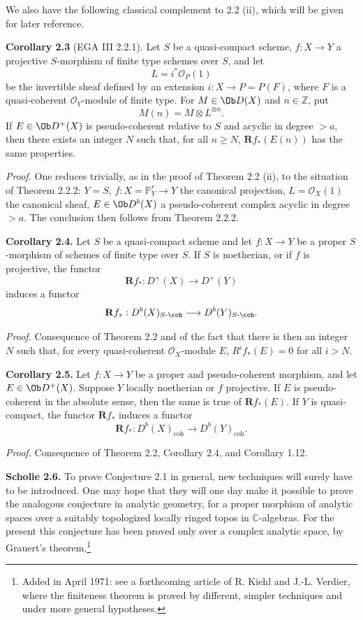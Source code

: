\documentclass[11pt]{article}
\begin{document}
We also have the following classical complement to 2.2 (ii), which will be given for later reference.

\textbf{Corollary 2.3} (EGA III 2.2.1). Let \(S\) be a quasi-compact scheme, \(f:X\to Y\) a projective \(S\)-morphism of finite type schemes over \(S\), and let
\[
  L=i^*\mathcal O_P(1)
\]
be the invertible sheaf defined by an extension \(i:X\to P=P(F)\), where \(F\) is a quasi-coherent \(\mathcal O_Y\)-module of finite type. For \(M\in \Ob D(X)\) and \(n\in\mathbb Z\), put
\[
  M(n)=M\otimes L^{\otimes n}.
\]
If \(E\in \Ob D^+(X)\) is pseudo-coherent relative to \(S\) and acyclic in degree \(>a\), then there exists an integer \(N\) such that, for all \(n\geq N\), \(\mathbf Rf_*(E(n))\) has the same properties.

\emph{Proof.} One reduces trivially, as in the proof of Theorem 2.2 (ii), to the situation of Theorem 2.2.2: \(Y=S\), \(f:X=\mathbb P^r_Y\to Y\) the canonical projection, \(L=\mathcal O_X(1)\) the canonical sheaf, \(E\in\Ob D^b(X)\) a pseudo-coherent complex acyclic in degree \(>a\). The conclusion then follows from Theorem 2.2.2.

\textbf{Corollary 2.4.} Let \(S\) be a quasi-compact scheme and let \(f:X\to Y\) be a proper \(S\)-morphism of schemes of finite type over \(S\). If \(S\) is noetherian, or if \(f\) is projective, the functor
\[
  \mathbf Rf_*:D^+(X)\longrightarrow D^+(Y)
\]
induces a functor
\[
  \mathbf Rf_*:D^b(X)_{S\text{-}\coh}\longrightarrow D^b(Y)_{S\text{-}\coh}.
\]

\emph{Proof.} Consequence of Theorem 2.2 and of the fact that there is then an integer \(N\) such that, for every quasi-coherent \(\mathcal O_X\)-module \(E\), \(R^if_*(E)=0\) for all \(i>N\).

\textbf{Corollary 2.5.} Let \(f:X\to Y\) be a proper and pseudo-coherent morphism, and let \(E\in \Ob D^+(X)\). Suppose \(Y\) locally noetherian or \(f\) projective. If \(E\) is pseudo-coherent in the absolute sense, then the same is true of \(\mathbf Rf_*(E)\). If \(Y\) is quasi-compact, the functor \(\mathbf Rf_*\) induces a functor
\[
  \mathbf Rf_*:D^b(X)_{\mathrm{coh}}\longrightarrow D^b(Y)_{\mathrm{coh}}.
\]

\emph{Proof.} Consequence of Theorem 2.2, Corollary 2.4, and Corollary 1.12.

\textbf{Scholie 2.6.} To prove Conjecture 2.1 in general, new techniques will surely have to be introduced. One may hope that they will one day make it possible to prove the analogous conjecture in analytic geometry, for a proper morphism of analytic spaces over a suitably topologized locally ringed topos in \(\mathbb C\)-algebras. For the present this conjecture has been proved only over a complex analytic space, by Grauert's theorem.\footnote{Added in April 1971: see a forthcoming article of R. Kiehl and J.-L. Verdier, where the finiteness theorem is proved by different, simpler techniques and under more general hypotheses.}
\end{document}
